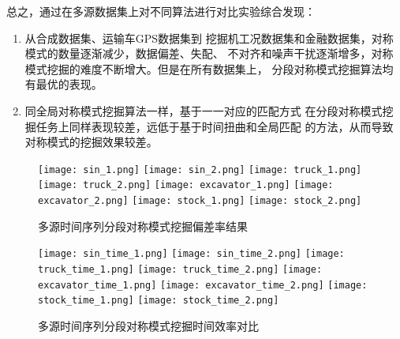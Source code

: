 总之，通过在多源数据集上对不同算法进行对比实验综合发现：
\begin{enumerate}
  \item 从合成数据集、运输车GPS数据集到
  挖掘机工况数据集和金融数据集，对称模式的数量逐渐减少，数据偏差、失配、
  不对齐和噪声干扰逐渐增多，对称模式挖掘的难度不断增大。但是在所有数据集上，
  分段对称模式挖掘算法均有最优的表现。
  \item 同全局对称模式挖掘算法一样，基于一一对应的匹配方式
  在分段对称模式挖掘任务上同样表现较差，远低于基于时间扭曲和全局匹配
  的方法，从而导致对称模式的挖掘效果较差。
\end{enumerate}


\begin{figure}
  \centering
  {\texttt{[image: sin\_1.png]}}
  {\texttt{[image: sin\_2.png]}}
  {\texttt{[image: truck\_1.png]}}
  {\texttt{[image: truck\_2.png]}}
  {\texttt{[image: excavator\_1.png]}}
  {\texttt{[image: excavator\_2.png]}}
  {\texttt{[image: stock\_1.png]}}
  {\texttt{[image: stock\_2.png]}}
  \caption{多源时间序列分段对称模式挖掘偏差率结果}
  \label{fig:segement_symmetry}
\end{figure}

\begin{figure}
  \centering
  {\texttt{[image: sin\_time\_1.png]}}
  {\texttt{[image: sin\_time\_2.png]}}
  {\texttt{[image: truck\_time\_1.png]}}
  {\texttt{[image: truck\_time\_2.png]}}
  {\texttt{[image: excavator\_time\_1.png]}}
  {\texttt{[image: excavator\_time\_2.png]}}
  {\texttt{[image: stock\_time\_1.png]}}
  {\texttt{[image: stock\_time\_2.png]}}
  \caption{多源时间序列分段对称模式挖掘时间效率对比}
  \label{fig:segement_algorithm_time}
\end{figure}

